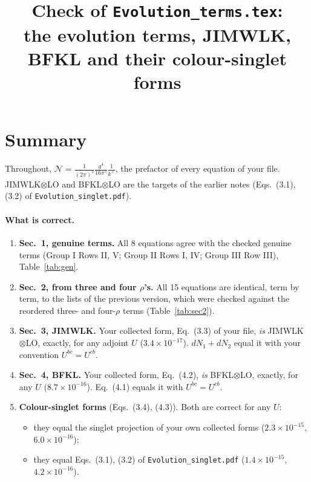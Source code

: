 \documentclass[10pt]{article}
\title{Check of \texttt{Evolution\_terms.tex}:\\ the evolution terms, JIMWLK, BFKL and their colour-singlet forms}
\date{}
\numberwithin{equation}{section}
\newcommand{\NN}{\mathcal N}
\begin{document}
\maketitle
\tableofcontents

\section{Summary}\label{sec:summary}
Throughout, $\NN=\frac{1}{(2\pi)^3}\frac{g^4}{16\pi^5}\frac{1}{k^+}$, the prefactor of every equation of your file. JIMWLK$\otimes$LO and BFKL$\otimes$LO are the targets of the earlier notes (Eqs.~(3.1), (3.2) of \texttt{Evolution\_singlet.pdf}).

\paragraph{What is correct.}
\begin{enumerate}
\item \textbf{Sec.~1, genuine terms.} All 8 equations agree with the checked genuine terms (Group I Rows II, V; Group II Rows I, IV; Group III Row III), Table~\ref{tab:gen}.
\item \textbf{Sec.~2, from three and four $\rho$'s.} All 15 equations are identical, term by term, to the lists of the previous version, which were checked against the reordered three- and four-$\rho$ terms (Table~\ref{tab:sec2}).
\item \textbf{Sec.~3, JIMWLK.} Your collected form, Eq.~(3.3) of your file, \emph{is} JIMWLK$\otimes$LO, exactly, for any adjoint $U$ ($3.4\times10^{-17}$). $dN_1+dN_2$ equal it with your convention $U^{bc}=U^{cb}$.
\item \textbf{Sec.~4, BFKL.} Your collected form, Eq.~(4.2), \emph{is} BFKL$\otimes$LO, exactly, for any $U$ ($8.7\times10^{-16}$). Eq.~(4.1) equals it with $U^{bc}=U^{cb}$.
\item \textbf{Colour-singlet forms} (Eqs.~(3.4), (4.3)). Both are correct for any $U$:
\begin{itemize}
\item they equal the singlet projection of your own collected forms ($2.3\times10^{-15}$, $6.0\times10^{-16}$);
\item they equal Eqs.~(3.1), (3.2) of \texttt{Evolution\_singlet.pdf} ($1.4\times10^{-15}$, $4.2\times10^{-16}$).
\end{itemize}
\end{enumerate}
\end{document}
